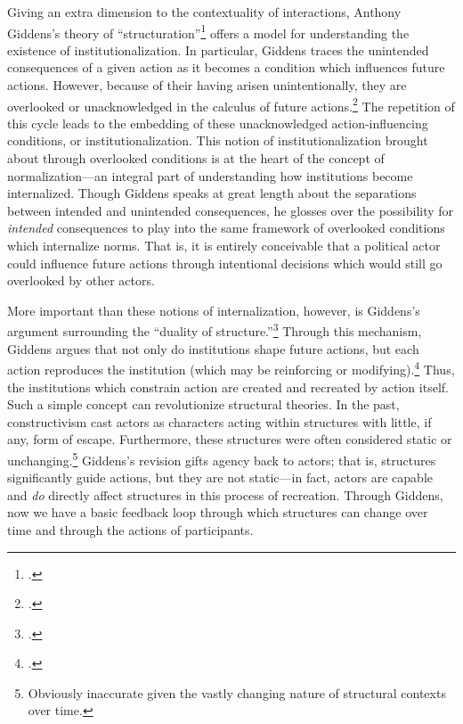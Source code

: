 \documentclass[openany,twoside]{memoir}
\begin{document}
\begin{Spacing}{2}
Giving an extra dimension to the contextuality of interactions, Anthony Giddens's theory of ``structuration''\footcite{giddens86} offers a model for understanding the existence of institutionalization.
In particular, Giddens traces the unintended consequences of a given action as it becomes a condition which influences future actions.
However, because of their having arisen unintentionally, they are overlooked or unacknowledged in the calculus of future actions.\footcite[5]{giddens86}
The repetition of this cycle leads to the embedding of these unacknowledged action-influencing conditions, or institutionalization.
This notion of institutionalization brought about through overlooked conditions is at the heart of the concept of normalization---an integral part of understanding how institutions become internalized.
Though Giddens speaks at great length about the separations between intended and unintended consequences, he glosses over the possibility for \emph{intended} consequences to play into the same framework of overlooked conditions which internalize norms.
That is, it is entirely conceivable that a political actor could influence future actions through intentional decisions which would still go overlooked by other actors. 

More important than these notions of internalization, however, is Giddens's argument surrounding the ``duality of structure.''\footcite[16]{giddens86}
Through this mechanism, Giddens argues that not only do institutions shape future actions, but each action reproduces the institution (which may be reinforcing or modifying).\footcite[19]{giddens86}
Thus, the institutions which constrain action are created and recreated by action itself.
Such a simple concept can revolutionize structural theories.
In the past, constructivism cast actors as characters acting within structures with little, if any, form of escape.
Furthermore, these structures were often considered static or unchanging.\footnote{
Obviously inaccurate given the vastly changing nature of structural contexts over time.}
Giddens's revision gifts agency back to actors; that is, structures significantly guide actions, but they are not static---in fact, actors are capable and \emph{do} directly affect structures in this process of recreation.
Through Giddens, now we have a basic feedback loop through which structures can change over time and through the actions of participants.


\end{Spacing}
\end{document}
